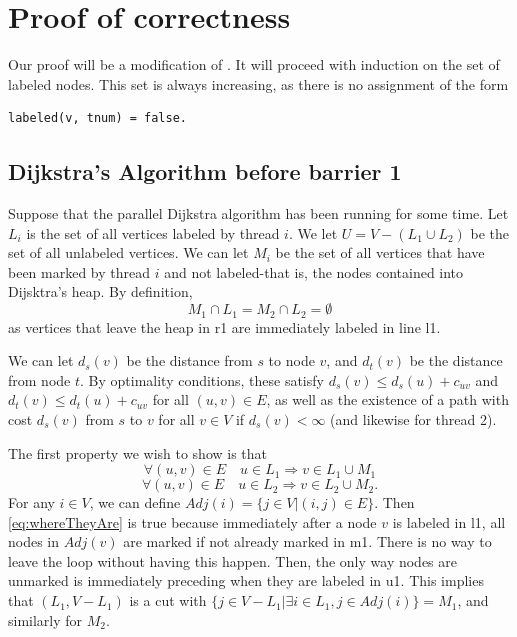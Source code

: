\documentclass{article}
\begin{document}

\section{Proof of correctness}

Our proof will be a modification of \cite{dijk}.
It will proceed with induction on the set of labeled nodes.
This set is always increasing, as there is no assignment of the form 
\begin{lstlisting}
labeled(v, tnum) = false.
\end{lstlisting}

\subsection{Dijkstra's Algorithm before barrier 1}

Suppose that the parallel Dijkstra algorithm has been running for some time.
Let $L_i$ is the set of all vertices labeled by thread $i$.
We let $U = V - (L_1 \cup L_2)$ be the set of all unlabeled vertices. 
We can let $M_i$ be the set of all vertices that have been marked by thread $i$ and not labeled-that is, the nodes contained into Dijsktra's heap.
By definition,
$$M_1 \cap L_1 = M_2 \cap L_2 = \emptyset$$
as vertices that leave the heap in r1 are immediately labeled in line l1.


We can let $d_s(v)$ be the distance from $s$ to node $v$, and $d_t(v)$ be the distance from node $t$.
By optimality conditions, these satisfy $d_s(v) \le d_s(u) + c_{uv}$ and $d_t(v) \le d_t(u) + c_{uv}$
for all $(u,v) \in E$, as well as the existence of a path with cost $d_s(v)$ from $s$ to $v$ for all $v \in V$ if $d_s(v) < \infty$ (and likewise for thread 2).

The first property we wish to show is that
$$\forall (u,v) \in E \quad u \in L_1 \Rightarrow v \in L_1 \cup M_1 $$
\begin{equation}
\forall   (u,v) \in E \quad u \in L_2 \Rightarrow v \in L_2 \cup M_2.
\label{eq:whereTheyAre}
\end{equation}
For any $i\in V$, we can define $Adj(i) = \{ j \in V | (i,j) \in E \}$.
Then \ref{eq:whereTheyAre} is true because immediately after a node $v$ is labeled in l1, all nodes in $Adj(v)$ are marked if not already marked in m1.
There is no way to leave the loop without having this happen.
Then, the only way nodes are unmarked is immediately preceding when they are labeled in u1.
This implies that $(L_1, V-L_1)$ is a cut with $\{ j \in V-L_1 | \exists i \in L_1, j \in Adj(i) \} = M_1$, and similarly for $M_2$.
\end{document}
